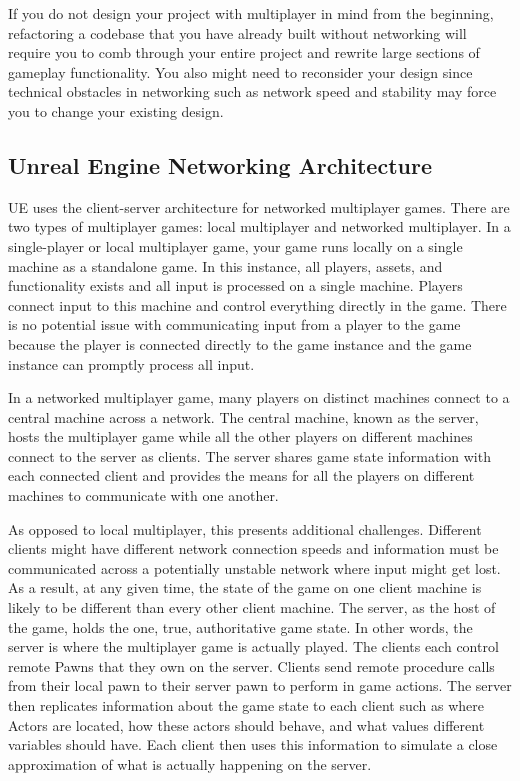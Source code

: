 \documentclass[
  letterpaper,
  DIV=11,
  numbers=noendperiod]{scrartcl}
\begin{document}
If you do not design your project with multiplayer in mind from the
beginning, refactoring a codebase that you have already built without
networking will require you to comb through your entire project and
rewrite large sections of gameplay functionality. You also might need to
reconsider your design since technical obstacles in networking such as
network speed and stability may force you to change your existing
design.

\subsection{Unreal Engine Networking
Architecture}\label{unreal-engine-networking-architecture}

UE uses the client-server architecture for networked multiplayer games.
There are two types of multiplayer games: local multiplayer and
networked multiplayer. In a single-player or local multiplayer game,
your game runs locally on a single machine as a standalone game. In this
instance, all players, assets, and functionality exists and all input is
processed on a single machine. Players connect input to this machine and
control everything directly in the game. There is no potential issue
with communicating input from a player to the game because the player is
connected directly to the game instance and the game instance can
promptly process all input.

In a networked multiplayer game, many players on distinct machines
connect to a central machine across a network. The central machine,
known as the server, hosts the multiplayer game while all the other
players on different machines connect to the server as clients. The
server shares game state information with each connected client and
provides the means for all the players on different machines to
communicate with one another.

As opposed to local multiplayer, this presents additional challenges.
Different clients might have different network connection speeds and
information must be communicated across a potentially unstable network
where input might get lost. As a result, at any given time, the state of
the game on one client machine is likely to be different than every
other client machine. The server, as the host of the game, holds the
one, true, authoritative game state. In other words, the server is where
the multiplayer game is actually played. The clients each control remote
Pawns that they own on the server. Clients send remote procedure calls
from their local pawn to their server pawn to perform in game actions.
The server then replicates information about the game state to each
client such as where Actors are located, how these actors should behave,
and what values different variables should have. Each client then uses
this information to simulate a close approximation of what is actually
happening on the server.
\end{document}
